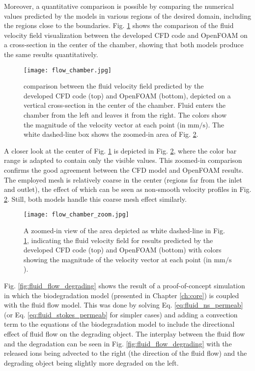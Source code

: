 Moreover, a quantitative comparison is possible by comparing the numerical values predicted by the models in various regions of the desired domain, including the regions close to the boundaries. Fig. \ref{fig:fluid_flow_chamber} shows the comparison of the fluid velocity field visualization between the developed {CFD} code and OpenFOAM on a cross-section in the center of the chamber, showing that both models produce the same results quantitatively.

\begin{figure}[h]
\centering
\medskip
\texttt{[image: flow\_chamber.jpg]}
\caption[Comparing flow field results of developed CFD code and OpenFOAM]{comparison between the fluid velocity field predicted by the developed {CFD} code (top) and OpenFOAM (bottom), depicted on a vertical cross-section in the center of the chamber. Fluid enters the chamber from the left and leaves it from the right. The colors show the magnitude of the velocity vector at each point (in $\mathrm{mm}/\mathrm{s}$). The white dashed-line box shows the zoomed-in area of Fig. \ref{fig:fluid_flow_chamber_zoom}.} \label{fig:fluid_flow_chamber}
\end{figure}

A closer look at the center of Fig. \ref{fig:fluid_flow_chamber} is depicted in Fig. \ref{fig:fluid_flow_chamber_zoom}, where the color bar range is adapted to contain only the visible values. This zoomed-in comparison confirms the good agreement between the {CFD} model and OpenFOAM results. The employed mesh is relatively coarse in the center (regions far from the inlet and outlet), the effect of which can be seen as non-smooth velocity profiles in Fig. \ref{fig:fluid_flow_chamber_zoom}. Still, both models handle this coarse mesh effect similarly.

\begin{figure}[h]
\centering
\medskip
\texttt{[image: flow\_chamber\_zoom.jpg]}
\caption[Comparing flow field results of developed CFD code and OpenFOAM - zoomed-in view]{A zoomed-in view of the area depicted as white dashed-line in Fig. \ref{fig:fluid_flow_chamber}, indicating the fluid velocity field for results predicted by the developed {CFD} code (top) and OpenFOAM (bottom) with colors showing the magnitude of the velocity vector at each point (in $\mathrm{mm}/\mathrm{s}$).} \label{fig:fluid_flow_chamber_zoom}
\end{figure}

Fig. \ref{fig:fluid_flow_degrading} shows the result of a proof-of-concept simulation in which the biodegradation model \cite{Barzegari2021} (presented in Chapter \ref{ch:core}) is coupled with the fluid flow model. This was done by solving Eq. \ref{eq:fluid_ns_permeab} (or Eq. \ref{eq:fluid_stokes_permeab} for simpler cases) and adding a convection term to the equations of the biodegradation model to include the directional effect of fluid flow on the degrading object. The interplay between the fluid flow and the degradation can be seen in Fig. \ref{fig:fluid_flow_degrading} with the released ions being advected to the right (the direction of the fluid flow) and the degrading object being slightly more degraded on the left.

